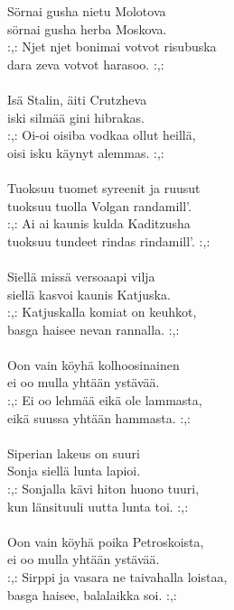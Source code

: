 
Sörnai gusha nietu Molotova \\ sörnai gusha herba Moskova. \\ :,: Njet njet bonimai votvot risubuska \\ dara zeva votvot harasoo. :,: \\ \hspace{10mm} \\ Isä Stalin, äiti Crutzheva \\ iski silmää gini hibrakas. \\ :,: Oi-oi oisiba vodkaa ollut heillä, \\ oisi isku käynyt alemmas. :,: \\ \hspace{10mm} \\ Tuoksuu tuomet syreenit ja ruusut \\ tuoksuu tuolla Volgan randamill'. \\ :,: Ai ai kaunis kulda Kaditzusha \\ tuoksuu tundeet rindas rindamill'. :,: \\ \hspace{10mm} \\ Siellä missä versoaapi vilja \\ siellä kasvoi kaunis Katjuska. \\ :,: Katjuskalla komiat on keuhkot, \\ basga haisee nevan rannalla. :,: \\ \hspace{10mm} \\ Oon vain köyhä kolhoosinainen \\ ei oo mulla yhtään ystävää. \\ :,: Ei oo lehmää eikä ole lammasta, \\ eikä suussa yhtään hammasta. :,: \\ \hspace{10mm} \\ Siperian lakeus on suuri \\ Sonja siellä lunta lapioi. \\ :,: Sonjalla kävi hiton huono tuuri, \\ kun länsituuli uutta lunta toi. :,: \\ \hspace{10mm} \\ Oon vain köyhä poika Petroskoista, \\ ei oo mulla yhtään ystävää. \\ :,: Sirppi ja vasara ne taivahalla loistaa, \\ basga haisee, balalaikka soi. :,: